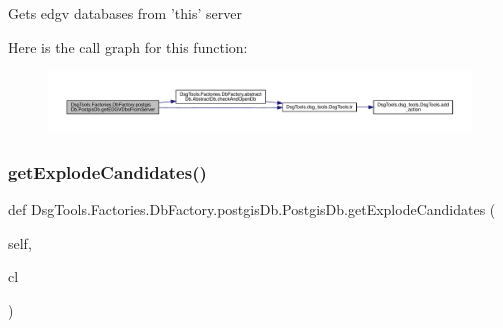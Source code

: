 \begin{DoxyVerb}Gets edgv databases from 'this' server
\end{DoxyVerb}
 Here is the call graph for this function\+:
\nopagebreak
\begin{figure}[H]
\begin{center}
\leavevmode
\includegraphics[width=350pt]{class_dsg_tools_1_1_factories_1_1_db_factory_1_1postgis_db_1_1_postgis_db_a7136ab08673e14998876dd8f41f7694c_cgraph}
\end{center}
\end{figure}
\mbox{\label{class_dsg_tools_1_1_factories_1_1_db_factory_1_1postgis_db_1_1_postgis_db_a73af37a3d5f70ddac857d96693bb789b}} 
\subsubsection{\texorpdfstring{get\+Explode\+Candidates()}{getExplodeCandidates()}}
{\footnotesize\ttfamily def Dsg\+Tools.\+Factories.\+Db\+Factory.\+postgis\+Db.\+Postgis\+Db.\+get\+Explode\+Candidates (\begin{DoxyParamCaption}\item[{}]{self,  }\item[{}]{cl }\end{DoxyParamCaption})}

